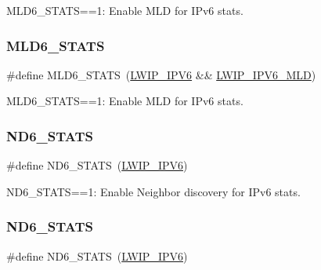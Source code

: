 M\+L\+D6\+\_\+\+S\+T\+A\+TS==1\+: Enable M\+LD for I\+Pv6 stats. \mbox{\label{group__lwip__opts__stats_gaf263df10b63b38201cae3d2dd5fb0b9e}} 
\subsubsection{\texorpdfstring{M\+L\+D6\+\_\+\+S\+T\+A\+TS}{MLD6\_STATS}\hspace{0.1cm}{\footnotesize\ttfamily [2/2]}}
{\footnotesize\ttfamily \#define M\+L\+D6\+\_\+\+S\+T\+A\+TS~(\hyperlink{openmote-cc2538_2lwip_2test_2fuzz_2lwipopts_8h_a872e3bb3fe2212156d66b18fccc9643f}{L\+W\+I\+P\+\_\+\+I\+P\+V6} \&\& \hyperlink{group__lwip__opts__mld6_ga44d8f24eaebbc50221ac1336212a3528}{L\+W\+I\+P\+\_\+\+I\+P\+V6\+\_\+\+M\+LD})}

M\+L\+D6\+\_\+\+S\+T\+A\+TS==1\+: Enable M\+LD for I\+Pv6 stats. \mbox{\label{group__lwip__opts__stats_ga753161114df60299a28d51c092c756cf}} 
\subsubsection{\texorpdfstring{N\+D6\+\_\+\+S\+T\+A\+TS}{ND6\_STATS}\hspace{0.1cm}{\footnotesize\ttfamily [1/2]}}
{\footnotesize\ttfamily \#define N\+D6\+\_\+\+S\+T\+A\+TS~(\hyperlink{openmote-cc2538_2lwip_2test_2fuzz_2lwipopts_8h_a872e3bb3fe2212156d66b18fccc9643f}{L\+W\+I\+P\+\_\+\+I\+P\+V6})}

N\+D6\+\_\+\+S\+T\+A\+TS==1\+: Enable Neighbor discovery for I\+Pv6 stats. \mbox{\label{group__lwip__opts__stats_ga753161114df60299a28d51c092c756cf}} 
\subsubsection{\texorpdfstring{N\+D6\+\_\+\+S\+T\+A\+TS}{ND6\_STATS}\hspace{0.1cm}{\footnotesize\ttfamily [2/2]}}
{\footnotesize\ttfamily \#define N\+D6\+\_\+\+S\+T\+A\+TS~(\hyperlink{openmote-cc2538_2lwip_2test_2fuzz_2lwipopts_8h_a872e3bb3fe2212156d66b18fccc9643f}{L\+W\+I\+P\+\_\+\+I\+P\+V6})}

